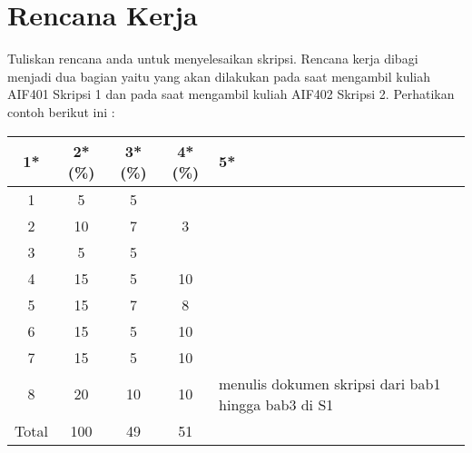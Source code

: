\documentclass[a4paper,twoside]{article}
\begin{document}
\section{Rencana Kerja}
Tuliskan rencana anda untuk menyelesaikan skripsi. Rencana kerja dibagi menjadi dua bagian yaitu yang akan dilakukan pada saat mengambil kuliah AIF401 Skripsi 1 dan pada saat mengambil kuliah AIF402 Skripsi 2. Perhatikan contoh berikut ini :


\begin{center}
  \begin{tabular}{ | c | c | c | c | l |}
    \hline
    1*  & 2*(\%) & 3*(\%) & 4*(\%) &5*\\ \hline \hline
    1 & 5 & 5 & & \\ \hline
    2 & 10 & 7 & 3 & \\ \hline
    3 & 5 & 5 & & \\ \hline
    4 & 15 & 5 & 10 & \\ \hline
    5 & 15 & 7 & 8 & \\ \hline
    6 & 15 & 5 & 10 & \\ \hline
    7 & 15 & 5 & 10 & \\ \hline
    8 & 20 & 10 & 10 & {\footnotesize menulis dokumen skripsi dari bab1 hingga bab3 di S1} \\ \hline
    Total & 100 & 49 & 51 & \\ \hline
                          \end{tabular}
\end{center}
\end{document}
